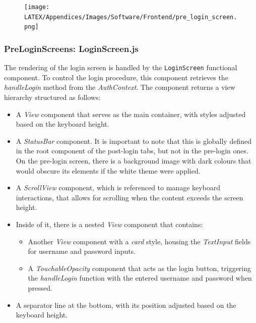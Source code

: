 \begin{figure}[!ht]
    \centering
    \texttt{[image: LATEX/Appendices/Images/Software/Frontend/pre\_login\_screen.png]}
    \label{fig:pre login screen}
\end{figure}

\subsubsection{PreLoginScreens: LoginScreen.js}

The rendering of the login screen is handled by the \texttt{LoginScreen} functional component. To control the login procedure, this component retrieves the \textit{handleLogin} method from the \textit{AuthContext}. The component returns a view hierarchy structured as follows:

\begin{itemize}
    \item A \textit{View} component that serves as the main container, with styles adjusted based on the keyboard height.
    \item A \textit{StatusBar} component. It is important to note that this is globally defined in the root component of the post-login tabs, but not in the pre-login ones. On the pre-login screen, there is a background image with dark colours that would obscure its elements if the white theme were applied.
    \item A \textit{ScrollView} component, which is referenced to manage keyboard interactions, that allows for scrolling when the content exceeds the screen height.
    \item Inside of it, there is a nested \textit{View} component that contains:
    \begin{itemize}
        \item Another \textit{View} component with a \textit{card} style, housing the \textit{TextInput} fields for username and password inputs.
        \item A \textit{TouchableOpacity} component that acts as the login button, triggering the \textit{handleLogin} function with the entered username and password when pressed.
    \end{itemize}
    \item A separator line at the bottom, with its position adjusted based on the keyboard height.
\end{itemize}

